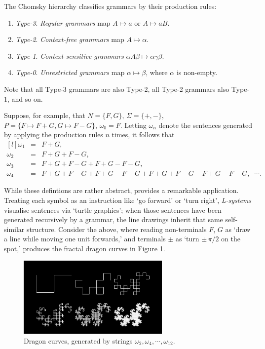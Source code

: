 \documentclass[a4paper, 11pt]{article}
\begin{document}
\begin{flushleft}
\vspace{5pt}\noindent
The Chomsky hierarchy \citep{chomskyHierarchy} %
classifies grammars by their production rules:
\begin{enumerate}[label=,itemsep=0em]
\item \textit{Type-3}. \textit{Regular grammars} map $A \mapsto a$ or $A \mapsto aB$.
\item \textit{Type-2}. \textit{Context-free grammars} map $A \mapsto \alpha$.
\item \textit{Type-1}. \textit{Context-sensitive grammars} $\alpha A\beta \mapsto \alpha\gamma\beta$.
\item \textit{Type-0}. \textit{Unrestricted grammars} map $\alpha \mapsto \beta$, where $\alpha$ is non-empty.
\end{enumerate}
Note that all Type-3 grammars are also Type-2, all Type-2 grammars also Type-1, and so on.

\vspace{5pt}\noindent
Suppose, for example, that $N = \{F, G\}$, $\Sigma = \{+, -\}$, $P = \{F \mapsto F+G, G \mapsto F-G\}$, $\omega_0 = F$.
Letting $\omega_n$ denote the sentences generated by applying the production rules $n$ times, it follows that
$$\begin{matrix*}[l]
\omega_1 &= &F+G, \\
\omega_2 &= &F+G+F-G, \\
\omega_3 &= &F+G+F-G+F+G-F-G, \\
\omega_4 &= &F+G+F-G+F+G-F-G+F+G+F-G-F+G-F-G, \;\; \cdots.
\end{matrix*}$$

\vspace{5pt}\noindent
While these defintions are rather abstract, \citet{lindenmayerLSystems} provides a remarkable application. Treating each symbol as an instruction like `go forward' or `turn right', \textit{L-systems} visualise sentences via `turtle graphics'; when those sentences have been generated recursively by a grammar, the line drawings inherit that same self-similar structure. Consider the above, where reading non-terminals $F$, $G$ as `draw a line while moving one unit forwards,' and terminals $\pm$ as `turn $\pm\, \pi/2$ on the spot,' produces the fractal dragon curves in Figure \ref{Dragon Curves}.

\begin{figure}[h]
\centering
\includegraphics[width=0.66\textwidth]{Dragon Curves}
\caption{Dragon curves, generated by strings $\omega_2, \omega_4, \cdots, \omega_{12}$.}
\label{Dragon Curves}
\end{figure}


\end{flushleft}
\end{document}
